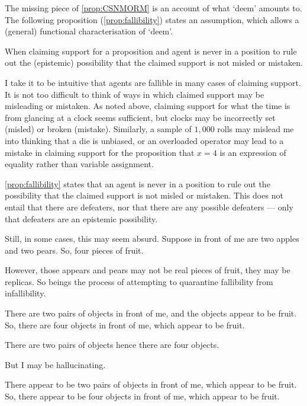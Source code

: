 \begin{note}
  The missing piece of \autoref{prop:CSNMORM} is an account of what `deem' amounts to.
  The following proposition (\ref{prop:fallibility}) states an assumption, which allows a (general) functional characterisation of `deem'.

  \begin{proposition}\label{prop:fallibility}
    When claiming support for a proposition and agent is never in a position to rule out the (epistemic) possibility that the claimed support is not misled or mistaken.
  \end{proposition}

  I take it to be intuitive that agents are fallible in many cases of claiming support.
  It is not too difficult to think of ways in which claimed support may be misleading or mistaken.
  As noted above, claiming support for what the time is from glancing at a clock seems sufficient, but clocks may be incorrectly set (misled) or broken (mistake).
  Similarly, a sample of \(1,000\) rolls may mislead me into thinking that a die is unbiased, or an overloaded operator may lead to a mistake in claiming support for the proposition that \(x = 4\) is an expression of equality rather than variable assignment.

  \autoref{prop:fallibility} states that an agent is never in a position to rule out the possibility that the claimed support is not misled or mistaken.
  This does not entail that there are defeaters, nor that there are any possible defeaters --- only that defeaters are an epistemic possibility.

  Still, in some cases, this may seem absurd.
  Suppose in front of me are two apples and two pears.
  So, four pieces of fruit.

  However, those appears and pears may not be real pieces of fruit, they may be replicas.
  So beings the process of attempting to quarantine fallibility from infallibility.

  There are two pairs of objects in front of me, and the objects appear to be fruit.
  So, there are four objects in front of me, which appear to be fruit.

  There are two pairs of objects hence there are four objects.

  But I may be hallucinating.

  There appear to be two pairs of objects in front of me, which appear to be fruit.
  So, there appear to be four objects in front of me, which appear to be fruit.


\end{note}
